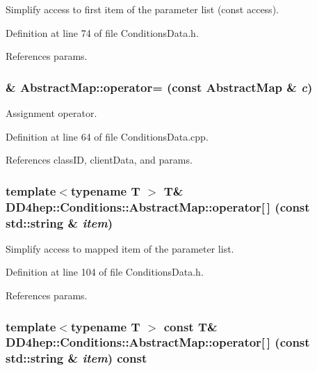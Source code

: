 Simplify access to first item of the parameter list (const access). 

Definition at line 74 of file ConditionsData.h.

References params.\hypertarget{class_d_d4hep_1_1_conditions_1_1_abstract_map_a31459d63620c03e542eea7903e25ff33}{
\subsubsection[{operator=}]{ \& AbstractMap::operator= (const {\bf AbstractMap} \& {\em c})}}
\label{class_d_d4hep_1_1_conditions_1_1_abstract_map_a31459d63620c03e542eea7903e25ff33}


Assignment operator. 

Definition at line 64 of file ConditionsData.cpp.

References classID, clientData, and params.\hypertarget{class_d_d4hep_1_1_conditions_1_1_abstract_map_a3cd2ad3c542cc2fb92aeb4e769d94509}{
\subsubsection[{operator[]}]{\setlength{\rightskip}{0pt plus 5cm}template$<$typename T $>$ {\bf T}\& DD4hep::Conditions::AbstractMap::operator\mbox{[}$\,$\mbox{]} (const std::string \& {\em item})}}
\label{class_d_d4hep_1_1_conditions_1_1_abstract_map_a3cd2ad3c542cc2fb92aeb4e769d94509}


Simplify access to mapped item of the parameter list. 

Definition at line 104 of file ConditionsData.h.

References params.\hypertarget{class_d_d4hep_1_1_conditions_1_1_abstract_map_aad3888e0cd1a6c1ea6ed9fb8b3611d90}{
\subsubsection[{operator[]}]{\setlength{\rightskip}{0pt plus 5cm}template$<$typename T $>$ const {\bf T}\& DD4hep::Conditions::AbstractMap::operator\mbox{[}$\,$\mbox{]} (const std::string \& {\em item}) const}}
\label{class_d_d4hep_1_1_conditions_1_1_abstract_map_aad3888e0cd1a6c1ea6ed9fb8b3611d90}


